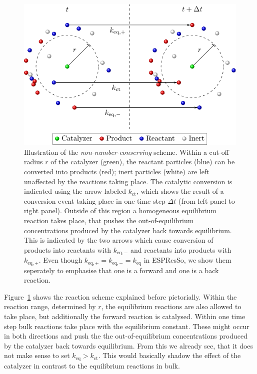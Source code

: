 \documentclass[aip,jcp,reprint,a4paper,onecolumn,nofootinbib,amsmath,amssymb]{revtex4-1}
\newcommand{\es}{\mbox{\textsf{ESPResSo}}\xspace}
\begin{document}
\begin{figure}
  \centering
  \includegraphics{FIGURES/non-number-conserving}
  \caption{Illustration of the \emph{non-number-conserving} scheme.
    Within a cut-off radius $r$ of the catalyzer (green), the reactant
    particles (blue) can be converted into products (red); inert
    particles (white) are left unaffected by the reactions taking
    place. The catalytic conversion is indicated using the arrow
    labeled $k_{\text{ct}}$, which shows the result of a conversion
    event taking place in one time step $\Delta t$ (from left panel to
    right panel). Outside of this region a homogeneous equilibrium
    reaction takes place, that pushes the out-of-equilibrium
    concentrations produced by the catalyzer back towards
    equilibrium. This is indicated by the two arrows which cause
    conversion of products into reactants with $k_{\text{eq},-}$ and
    reactants into products with $k_{\text{eq},+}$.  Even though
    $k_{\text{eq},+} = k_{\text{eq},-} = k_{\text{eq}}$ in \es, we
    show them seperately to emphasise that one is a forward and one is
    a back reaction.}
  \label{fig:nnc}
\end{figure}

Figure~\ref{fig:nnc} shows the reaction scheme explained before
pictorially.  Within the reaction range, determined by $r$, the
equilibrium reactions are also allowed to take place, but additionally
the forward reaction is catalysed.  Within one time step bulk
reactions take place with the equilibrium constant.  These might occur
in both directions and push the the out-of-equilibrium concentrations
produced by the catalyzer back towards equilibrium.  From this we
already see, that it does not make sense to set $k_{\text{eq}} >
k_{\text{ct}}$.  This would basically shadow the effect of the
catalyzer in contrast to the equilibrium reactions in bulk.
\end{document}
